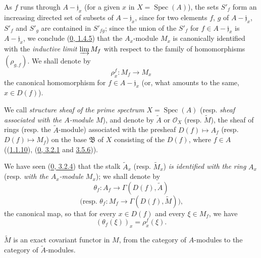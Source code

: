 As $f$ runs through $A-\mathfrak{j}_x$ (for a given $x$ in
$X=\operatorname{Spec}(A)$), the sets $S'_f$ form an increasing directed set
of subsets of $A-\mathfrak{j}_x$, since for two elements
$f$, $g$ of $A-\mathfrak{j}_x$, $S'_f$ and $S'_g$ are contained in
$S'_{fg}$; since the union of the $S'_f$ for $f\in A-\mathfrak{j}_x$ is
$A-\mathfrak{j}_x$, we conclude (\hyperref[0.1.4.5]{0, 1.4.5}) that the
$A_x$-module $M_x$ is canonically identified with the \emph{inductive limit}
$\varinjlim M_f$ with respect to the family of homomorphisms
$(\rho_{g,f})$. We shall denote by
\[
  \rho_x^f:M_f\longrightarrow M_x
\]
the canonical homomorphism for $f\in A-\mathfrak{j}_x$ (or, what amounts to
the same, $x\in D(f)$).

\begin{definition}[1.3.4]
\label{I.1.3.4}
We call \emph{structure sheaf of the prime spectrum}
$X=\operatorname{Spec}(A)$ (resp. \emph{sheaf associated with the $A$-module}
$M$), and denote by $\widetilde{A}$ or $\mathscr{O}_X$ (resp. $\widetilde{M}$),
the sheaf of rings (resp. the $\widetilde{A}$-module) associated with the
presheaf $D(f)\mapsto A_f$ (resp. $D(f)\mapsto M_f$) on the base $\mathfrak{B}$
of $X$ consisting of the $D(f)$, where $f\in A$
((\hyperref[I.1.1.10]{1.1.10}),
(\hyperref[0.3.2.1]{0, 3.2.1} and
\hyperref[0.3.5.6]{3.5.6})).
\end{definition}

We have seen (\hyperref[0.3.2.4]{0, 3.2.4}) that the stalk
$\widetilde{A}_x$ (resp. $\widetilde{M}_x$) \emph{is identified with the ring}
$A_x$ (resp. \emph{with the $A_x$-module} $M_x$); we shall denote by
\[
  \theta_f:A_f\longrightarrow\Gamma(D(f),\widetilde{A})
\]
\[
  \text{(resp. }\theta_f:M_f\longrightarrow
  \Gamma(D(f),\widetilde{M})\text{),}
\]
the canonical map, so that for every $x\in D(f)$ and every
$\xi\in M_f$, we have
\begin{equation}
  (\theta_f(\xi))_x=\rho_x^f(\xi).
  \tag{1.3.4.1}\label{I.1.3.4.1}
\end{equation}

\begin{proposition}[1.3.5]
\label{I.1.3.5}
$\widetilde{M}$ is an exact covariant functor in $M$, from the category of
$A$-modules to the category of $\widetilde{A}$-modules.
\end{proposition}

